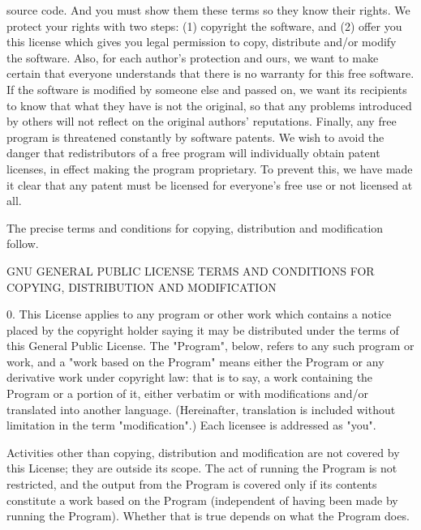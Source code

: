 \begin{DoxyCodeInclude}
\textcolor{stringliteral}{source code.  And you must show them these terms so they know their}
\textcolor{stringliteral}{rights.}
\textcolor{stringliteral}{}
\textcolor{stringliteral}{  We protect your rights with two steps: (1) copyright the software, and}
\textcolor{stringliteral}{(2) offer you this license which gives you legal permission to copy,}
\textcolor{stringliteral}{distribute and/or modify the software.}
\textcolor{stringliteral}{}
\textcolor{stringliteral}{  Also, for each author'}s protection and ours, we want to make certain
that everyone understands that there is no warranty \textcolor{keywordflow}{for} \textcolor{keyword}{this} free
software.  If the software is modified by someone \textcolor{keywordflow}{else} and passed on, we
want its recipients to know that what they have is not the original, so
that any problems introduced by others will not reflect on the original
authors\textcolor{stringliteral}{' reputations.}
\textcolor{stringliteral}{}
\textcolor{stringliteral}{  Finally, any free program is threatened constantly by software}
\textcolor{stringliteral}{patents.  We wish to avoid the danger that redistributors of a free}
\textcolor{stringliteral}{program will individually obtain patent licenses, in effect making the}
\textcolor{stringliteral}{program proprietary.  To prevent this, we have made it clear that any}
\textcolor{stringliteral}{patent must be licensed for everyone'}s free use or not licensed at all.

  The precise terms and conditions \textcolor{keywordflow}{for} copying, distribution and
modification follow.

                    GNU GENERAL PUBLIC LICENSE
   TERMS AND CONDITIONS FOR COPYING, DISTRIBUTION AND MODIFICATION

  0. This License applies to any program or other work which contains
a notice placed by the copyright holder saying it may be distributed
under the terms of \textcolor{keyword}{this} General Public License.  The \textcolor{stringliteral}{"Program"}, below,
refers to any such program or work, and a \textcolor{stringliteral}{"work based on the Program"}
means either the Program or any derivative work under copyright law:
that is to say, a work containing the Program or a portion of it,
either verbatim or with modifications and/or translated into another
language.  (Hereinafter, translation is included without limitation in
the term \textcolor{stringliteral}{"modification"}.)  Each licensee is addressed as \textcolor{stringliteral}{"you"}.

Activities other than copying, distribution and modification are not
covered by \textcolor{keyword}{this} License; they are outside its scope.  The act of
running the Program is not restricted, and the output from the Program
is covered only \textcolor{keywordflow}{if} its contents constitute a work based on the
Program (independent of having been made by running the Program).
Whether that is \textcolor{keyword}{true} depends on what the Program does.


\end{DoxyCodeInclude}
